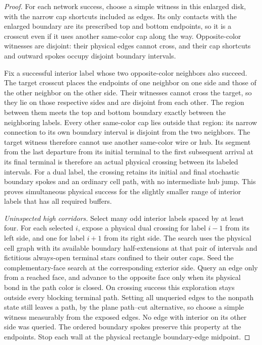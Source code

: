 \begin{proof}
For each network success, choose a simple witness in this enlarged
disk, with the narrow cap shortcuts included as edges. Its only
contacts with the enlarged boundary are its prescribed top and bottom
endpoints, so it is a crosscut even if it uses another same-color cap
along the way. Opposite-color witnesses are disjoint: their physical
edges cannot cross, and their cap shortcuts and outward spokes occupy
disjoint boundary intervals.

Fix a successful interior label whose two opposite-color neighbors
also succeed. The target crosscut places the endpoints of one neighbor
on one side and those of the other neighbor on the other side.
Their witnesses cannot cross the target, so they lie on those
respective sides and are disjoint from each other. The region between
them meets the top and bottom boundary exactly between the neighboring
labels. Every other same-color cap lies outside that region: its narrow
connection to its own boundary interval is disjoint from the two
neighbors. The target witness therefore cannot use another same-color
wire or hub. Its segment from the last departure from its initial
terminal to the first subsequent arrival at its final terminal is therefore an
actual physical crossing between its labeled intervals.
For a dual label, the crossing retains its initial and final stochastic
boundary spokes and an ordinary cell path, with no intermediate hub
jump. This proves simultaneous physical success for the slightly
smaller range of interior labels that has all required buffers.

\smallskip\noindent
\emph{Uninspected high corridors.}
Select many odd interior labels spaced by at least four.  For each
selected $i$, expose a physical dual crossing for label $i-1$ from
its left side, and one for label $i+1$ from its right side.  The
search uses the physical cell graph with its available boundary
half-extensions at that pair of intervals and fictitious always-open
terminal stars confined to their outer caps. Seed the complementary-face
search at the corresponding exterior side. Query an edge only from a reached face, and advance to the
opposite face only when its physical bond in the path color is closed.
On crossing success this exploration stays outside
every blocking terminal path.  Setting all unqueried edges to the
nonpath state still leaves a path, by the plane path--cut alternative,
so choose a simple witness measurably from the exposed edges.  No
edge with interior on its other side was queried.  The ordered
boundary spokes preserve this property at the endpoints.  Stop each
wall at the physical rectangle boundary-edge midpoint.


\end{proof}
